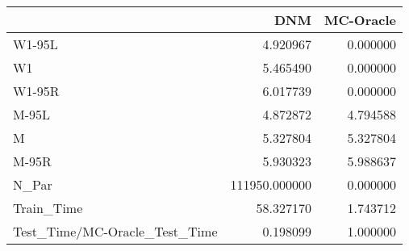 \begin{tabular}{lrr}
\toprule
{} &            DNM &  MC-Oracle \\
\midrule
W1-95L                        &       4.920967 &   0.000000 \\
W1                            &       5.465490 &   0.000000 \\
W1-95R                        &       6.017739 &   0.000000 \\
M-95L                         &       4.872872 &   4.794588 \\
M                             &       5.327804 &   5.327804 \\
M-95R                         &       5.930323 &   5.988637 \\
N\_Par                         &  111950.000000 &   0.000000 \\
Train\_Time                    &      58.327170 &   1.743712 \\
Test\_Time/MC-Oracle\_Test\_Time &       0.198099 &   1.000000 \\
\bottomrule
\end{tabular}
